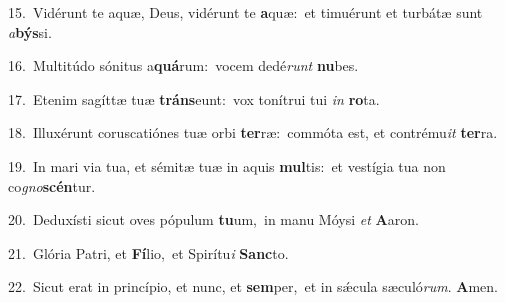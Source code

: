 {\numbfont\textcolor{\numbcolor}{15.}}~Vidérunt te aquæ, Deus, vidérunt te \textbf{a}\-quæ:~\star et timuérunt et turbátæ sunt \textit{a}\-\textbf{býs}si.\par
{\numbfont\textcolor{\numbcolor}{16.}}~Multitúdo sónitus a\-\textbf{quá}\-rum:~\star vocem dedé\textit{runt} \textbf{nu}\-bes.\par
{\numbfont\textcolor{\numbcolor}{17.}}~Etenim sagíttæ tuæ \textbf{tráns}\-eunt:~\star vox tonítrui tui \textit{in} \textbf{ro}\-ta.\par
{\numbfont\textcolor{\numbcolor}{18.}}~Illuxérunt coruscatiónes tuæ orbi \textbf{ter}\-ræ:~\star commóta est, et contrému\textit{it} \textbf{ter}\-ra.\par
{\numbfont\textcolor{\numbcolor}{19.}}~In mari via tua, et sémitæ tuæ in aquis \textbf{mul}\-tis:~\star et vestígia tua non co\-\textit{gno}\-\textbf{scén}tur.\par
{\numbfont\textcolor{\numbcolor}{20.}}~Deduxísti sicut oves pópulum \textbf{tu}\-um,~\star in manu Móysi \textit{et} \textbf{A}\-aron.\par
{\numbfont\textcolor{\numbcolor}{21.}}~Glória Patri, et \textbf{Fí}\-lio,~\star et Spirítu\textit{i} \textbf{Sanc}\-to.\par
{\numbfont\textcolor{\numbcolor}{22.}}~Sicut erat in princípio, et nunc, et \textbf{sem}\-per,~\star et in sǽcula sæculó\-\textit{rum}\-. \textbf{A}\-men.\par
